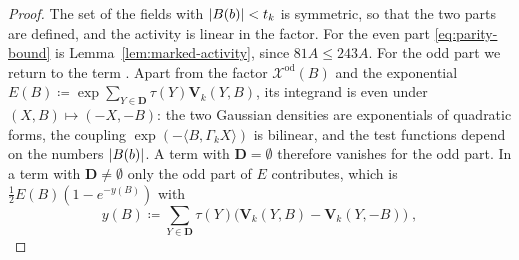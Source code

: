 \documentclass[11pt]{preprint}
\DeclarePairedDelimiter{\abs}{\lvert}{\rvert}
\numberwithin{equation}{section}
\theoremstyle{definition}
\theoremstyle{remark}
\theoremstyle{plain}
\begin{document}
\begin{proof}
The set of the fields with $\abs{B(b)} < t_k$ is symmetric, so that the two parts are defined, and the activity is linear in the factor. For the even part \eqref{eq:parity-bound} is Lemma~\ref{lem:marked-activity}, since $81A \leq 243A$. For the odd part we return to the term \cite[(2.14)]{BalabanRG2}. Apart from the factor $\mathcal X^{\mathrm{od}}(B)$ and the exponential $E(B) \coloneqq \exp\sum_{Y \in \mathbf D}\tau(Y)\mathbf V_k(Y, B)$, its integrand is even under $(X, B) \mapsto (-X, -B)$: the two Gaussian densities are exponentials of quadratic forms, the coupling $\exp(-\langle B, \Gamma_kX\rangle)$ is bilinear, and the test functions depend on the numbers $\abs{B(b)}$. A term with $\mathbf D = \emptyset$ therefore vanishes for the odd part. In a term with $\mathbf D \neq \emptyset$ only the odd part of $E$ contributes, which is $\frac12E(B)(1 - e^{-y(B)})$ with
\[
    y(B) \coloneqq \sum_{Y \in \mathbf D}\tau(Y)\bigl(\mathbf V_k(Y, B) - \mathbf V_k(Y, -B)\bigr)\;,
\]

\end{proof}
\end{document}
